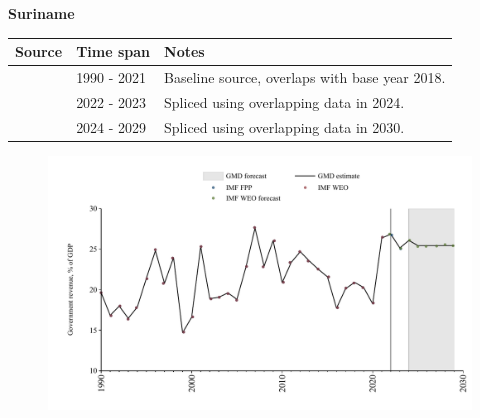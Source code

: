 \documentclass[12pt,a4paper,landscape]{article}
\begin{document}
\begin{adjustbox}{max totalsize={\paperwidth}{\paperheight},center}
\begin{minipage}[t][\textheight][t]{\textwidth}
\vspace*{0.5cm}
{}
\begin{center}
{\Large\bfseries Suriname}
\end{center}
\vspace{0.5cm}
\begin{table}[H]
\centering
\small
\begin{tabular}{|l|l|l|}
\hline
\textbf{Source} & \textbf{Time span} & \textbf{Notes} \\
\hline
\rowcolor{white}\cite{IMF_WEO}& 1990 - 2021 &Baseline source, overlaps with base year 2018.\\
\rowcolor{lightgray}\cite{IMF_FPP}& 2022 - 2023 &Spliced using overlapping data in 2024.\\
\rowcolor{white}\cite{IMF_WEO_forecast}& 2024 - 2029 &Spliced using overlapping data in 2030.\\
\hline
\end{tabular}
\end{table}
\begin{figure}[H]
\centering
\includegraphics[width=\textwidth,height=0.6\textheight,keepaspectratio]{graphs/SUR_govrev_GDP.pdf}
\end{figure}
\end{minipage}
\end{adjustbox}
\end{document}
